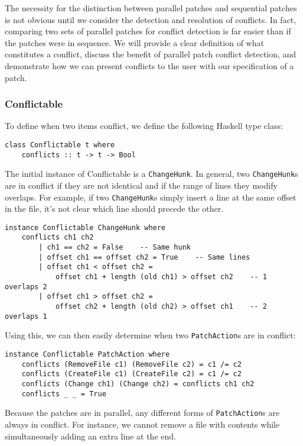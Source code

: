 \documentclass[]{article}
\begin{document}
The necessity for the distinction between parallel patches and
sequential patches is not obvious until we consider the detection and
resolution of conflicts. In fact, comparing two sets of parallel patches
for conflict detection is far easier than if the patches were in
sequence. We will provide a clear definition of what constitutes a
conflict, discuss the benefit of parallel patch conflict detection, and
demonstrate how we can present conflicts to the user with our
specification of a patch.

\subsubsection{Conflictable}

To define when two items conflict, we define the following Haskell type
class:

\begin{verbatim}
class Conflictable t where 
    conflicts :: t -> t -> Bool
\end{verbatim}

The initial instance of Conflictable is a \texttt{ChangeHunk}. In
general, two \texttt{ChangeHunk}s are in conflict if they are not
identical and if the range of lines they modify overlaps. For example,
if two \texttt{ChangeHunk}s simply insert a line at the same offset in
the file, it's not clear which line should precede the other.

\begin{verbatim}
instance Conflictable ChangeHunk where
    conflicts ch1 ch2
        | ch1 == ch2 = False    -- Same hunk
        | offset ch1 == offset ch2 = True    -- Same lines
        | offset ch1 < offset ch2 =
            offset ch1 + length (old ch1) > offset ch2    -- 1 overlaps 2
        | offset ch1 > offset ch2 =
            offset ch2 + length (old ch2) > offset ch1    -- 2 overlaps 1
\end{verbatim}

Using this, we can then easily determine when two \texttt{PatchAction}s
are in conflict:

\begin{verbatim}
instance Conflictable PatchAction where
    conflicts (RemoveFile c1) (RemoveFile c2) = c1 /= c2
    conflicts (CreateFile c1) (CreateFile c2) = c1 /= c2
    conflicts (Change ch1) (Change ch2) = conflicts ch1 ch2
    conflicts _ _ = True
\end{verbatim}

Because the patches are in parallel, any different forms of
\texttt{PatchAction}s are always in conflict. For instance, we cannot
remove a file with contents while simultaneously adding an extra line at
the end.
\end{document}
